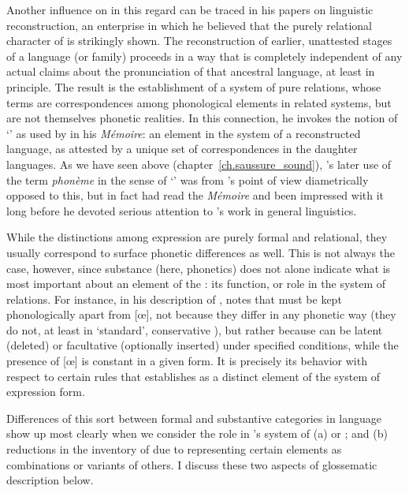 Another influence on {\Hjelmslev} in this regard can be traced in his
papers on linguistic reconstruction, an enterprise in which he
believed that the purely relational character of  is strikingly
shown. The reconstruction of earlier, unattested stages of a language
(or family) proceeds in a way that is completely independent of any
actual claims about the pronunciation of that ancestral language, at
least in principle. The result is the establishment of a system of
pure relations, whose terms are correspondences among phonological
elements in related systems, but are not themselves phonetic
realities. In this connection, he invokes the notion of `' as
used by {\Saussure} in his \textsl{Mémoire}: an element in the system of
a reconstructed language, as attested by a unique set of
correspondences in the daughter languages. As we have seen above
(chapter~\ref{ch.saussure_sound}), {\Saussure}'s later use of the term
\emph{phonème} in the sense of `' was from {\Hjelmslev}'s
point of view diametrically opposed to this, but in fact {\Hjelmslev} had
read the \textsl{Mémoire} and been impressed with it long before he
devoted serious attention to {\Saussure}'s work in general linguistics.

While the distinctions among expression  are purely formal and
relational, they usually correspond to surface phonetic differences as
well. This is not always the case, however, since substance (here,
phonetics) does not alone indicate what is most important about an
element of the : its function, or role in the system
of relations. For instance, in his description of , {\Hjelmslev}
notes that  must be kept phonologically apart from {[œ]}, not
because they differ in any phonetic way (they do not, at least in
`standard', conservative ), but rather because  can be
latent (deleted) or facultative (optionally inserted) under specified
conditions, while the presence of {[œ]} is constant in a given form. It
is precisely its behavior with respect to certain {rules} that
establishes  as a distinct element of the system of 
expression form.

Differences of this sort between formal and substantive categories in
language show up most clearly when we consider the role in {\Hjelmslev}'s
system of (a)  or ; and (b) reductions in the
inventory of  due to representing certain elements as
combinations or variants of others. I discuss these two aspects of
glossematic description below.

